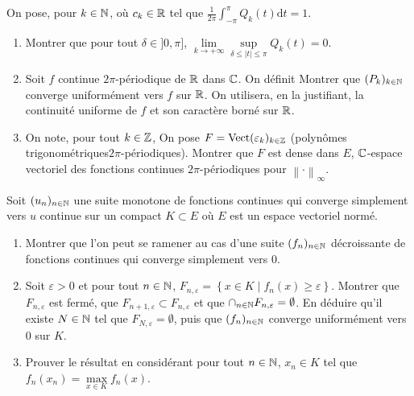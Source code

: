 \documentclass[12pt]{article}
\begin{document}
\begin{exercise}
    On pose, pour $k\in\mathbb{N}$,  où $c_{k}\in\mathbb{R}$ tel que $\frac{1}{2\pi}\int_{-\pi}^{\pi}Q_{k}(t)\mathrm{d}t=1$.
    \begin{enumerate}
        \item Montrer que pour tout $\delta\in]0,\pi]$, $\lim\limits_{k\to+\infty}\sup\limits_{\delta\leqslant\left\lvert t\right\rvert\leqslant\pi}Q_{k}(t)=0$.
        \item Soit $f$ continue $2\pi$-périodique de $\mathbb{R}$ dans $\mathbb{C}$. On définit 
        Montrer que $(P_k)_{k\in\mathbb{N}}$ converge uniformément vers $f$ sur $\mathbb{R}$. On utilisera, en la justifiant, la continuité uniforme de $f$ et son caractère borné sur $\mathbb{R}$.
        \item On note, pour tout $k\in\mathbb{Z}$, 
        On pose $F=\operatorname{Vect}(\varepsilon_{k})_{k\in\mathbb{Z}}$ (\og polynômes trigonométriques\fg $2\pi$-périodiques). Montrer que $F$ est dense dans $E$, $\mathbb{C}$-espace vectoriel des fonctions continues $2\pi$-périodiques pour $\left\lVert\cdot\right\rVert_{\infty}$.
    \end{enumerate}
\end{exercise}

\begin{exercise}
    Soit $(u_n)_{n\in\mathbb{N}}$ une suite monotone de fonctions continues qui converge simplement vers $u$ continue sur un compact $K\subset E$ où $E$ est un espace vectoriel normé.
    \begin{enumerate}
        \item Montrer que l'on peut se ramener au cas d'une suite $(f_n)_{n\in\mathbb{N}}$ décroissante de fonctions continues qui converge simplement vers 0.
        \item Soit $\varepsilon>0$ et pour tout $n\in\mathbb{N}$, $F_{n,\varepsilon}=\left\lbrace x\in K\middle| f_{n}(x)\geqslant\varepsilon\right\rbrace$. Montrer que $F_{n,\varepsilon}$ est fermé, que $F_{n+1,\varepsilon}\subset F_{n,\varepsilon}$ et que $\cap_{n\in\mathbb{N}}F_{n,\varepsilon}=\emptyset$. En déduire qu'il existe $N\in\mathbb{N}$ tel que $F_{N,\varepsilon}=\emptyset$, puis que $(f_{n})_{n\in\mathbb{N}}$ converge uniformément vers 0 sur $K$.
        \item Prouver le résultat en considérant pour tout $n\in\mathbb{N}$, $x_{n}\in K$ tel que $f_{n}(x_{n})=\max\limits_{x\in K}f_n(x)$.
    \end{enumerate}
\end{exercise}
\end{document}
